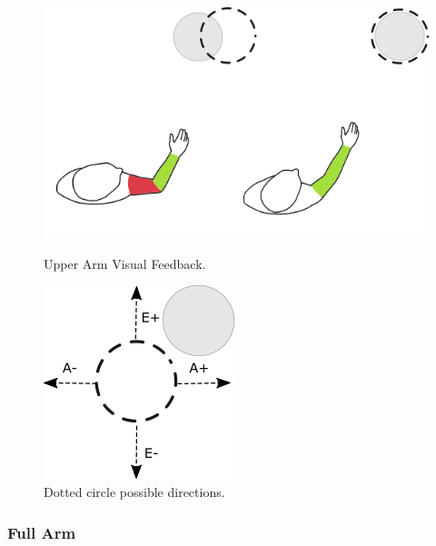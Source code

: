\begin{figure}[!t]
  \centering
  \includegraphics[width=0.8\linewidth]{imgs/approach/upperarmfeedback}
   \caption{Upper Arm Visual Feedback.}
   \label{fig:upperarmfeedback}
    \endminipage\hfill
{}
  \centering
  \includegraphics[width=0.5\linewidth]{imgs/approach/upperarmcirclemovement}
    \caption{Dotted circle possible directions.}
    \label{fig:upperarmcirclemovement}
    \endminipage
    \end{figure}

\subsubsection{Full Arm}

